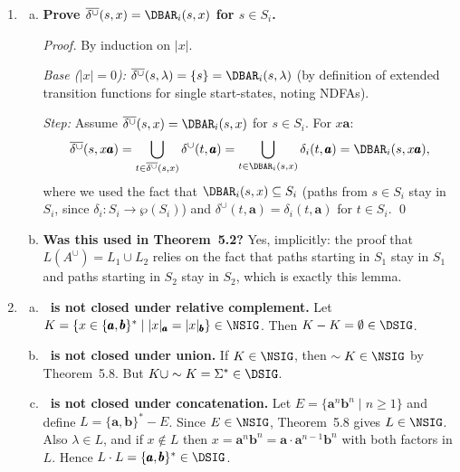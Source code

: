 \begin{enumerate}[{5.}1. ]
\item \begin{enumerate}[(a)]
  \item \textbf{Prove $\overline{\delta^\cup}(s,x)=\DBAR_i(s,x)$ for $s\in S_i$.}

  \begin{proof}
  By induction on $|x|$.

  \emph{Base ($|x|=0$):}  $\overline{\delta^\cup}(s,\lambda)=\{s\}=\DBAR_i(s,\lambda)$ (by definition of extended transition functions for single start-states, noting NDFAs).

  \emph{Step:}  Assume $\overline{\delta^\cup}(s,x)=\DBAR_i(s,x)$ for $s\in S_i$.  For $x\pmb{a}$:
  \[
    \overline{\delta^\cup}(s,x\pmb{a})
    =\bigcup_{t\in\overline{\delta^\cup}(s,x)}\delta^\cup(t,\pmb{a})
    =\bigcup_{t\in\DBAR_i(s,x)}\delta_i(t,\pmb{a})
    =\DBAR_i(s,x\pmb{a}),
  \]
  where we used the fact that $\DBAR_i(s,x)\subseteq S_i$ (paths from $s\in S_i$ stay in $S_i$, since $\delta_i:S_i\to\wp(S_i)$) and $\delta^\cup(t,\pmb{a})=\delta_i(t,\pmb{a})$ for $t\in S_i$. \qed
  \end{proof}

  \item \textbf{Was this used in Theorem~5.2?}  Yes, implicitly: the proof that $L(A^\cup)=L_1\cup L_2$ relies on the fact that paths starting in $S_1$ stay in $S_1$ and paths starting in $S_2$ stay in $S_2$, which is exactly this lemma.
\end{enumerate}

\item \begin{enumerate}[(a)]
  \item \textbf{\NSIG\ is not closed under relative complement.}  Let
  $K=\{x\in\{\pmb{a},\pmb{b}\}^*\mid |x|_{\pmb{a}}=|x|_{\pmb{b}}\}\in\NSIG$.
  Then $K-K=\emptyset\in\DSIG$.

  \item \textbf{\NSIG\ is not closed under union.}  If $K\in\NSIG$, then
  $\sim K\in\NSIG$ by Theorem~5.8.  But
  $K\cup\sim K=\Sigma^*\in\DSIG$.

  \item \textbf{\NSIG\ is not closed under concatenation.}  Let
  $E=\{\pmb{a}^n\pmb{b}^n\mid n\ge 1\}$ and define
  $L=\{\pmb{a},\pmb{b}\}^*-E$.  Since $E\in\NSIG$, Theorem~5.8 gives
  $L\in\NSIG$.  Also $\lambda\in L$, and if $x\notin L$ then
  $x=\pmb{a}^n\pmb{b}^n=\pmb{a}\cdot \pmb{a}^{n-1}\pmb{b}^n$ with both factors in
  $L$.  Hence $L\cdot L=\{\pmb{a},\pmb{b}\}^*\in\DSIG$.


\end{enumerate}
\end{enumerate}
